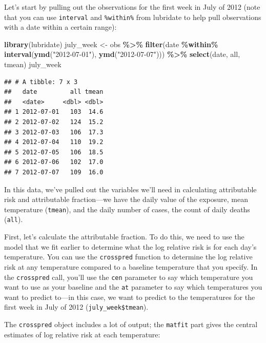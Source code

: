 \documentclass[
]{book}
\newenvironment{Shaded}{\begin{snugshade}}{\end{snugshade}}
\newcommand{\FunctionTok}[1]{\textcolor[rgb]{0.13,0.29,0.53}{\textbf{#1}}}
\newcommand{\NormalTok}[1]{#1}
\newcommand{\OtherTok}[1]{\textcolor[rgb]{0.56,0.35,0.01}{#1}}
\newcommand{\SpecialCharTok}[1]{\textcolor[rgb]{0.81,0.36,0.00}{\textbf{#1}}}
\newcommand{\StringTok}[1]{\textcolor[rgb]{0.31,0.60,0.02}{#1}}
\begin{document}
Let's start by pulling out the observations for the first week in July of 2012 (note that you can use \texttt{interval} and \texttt{\%within\%} from lubridate to help pull observations with a date within a certain range):

\begin{Shaded}
\begin{Highlighting}[]
\FunctionTok{library}\NormalTok{(lubridate)}
\NormalTok{july\_week }\OtherTok{\textless{}{-}}\NormalTok{ obs }\SpecialCharTok{\%\textgreater{}\%} 
  \FunctionTok{filter}\NormalTok{(date }\SpecialCharTok{\%within\%} \FunctionTok{interval}\NormalTok{(}\FunctionTok{ymd}\NormalTok{(}\StringTok{"2012{-}07{-}01"}\NormalTok{), }\FunctionTok{ymd}\NormalTok{(}\StringTok{"2012{-}07{-}07"}\NormalTok{))) }\SpecialCharTok{\%\textgreater{}\%} 
  \FunctionTok{select}\NormalTok{(date, all, tmean)}
\NormalTok{july\_week}
\end{Highlighting}
\end{Shaded}

\begin{verbatim}
## # A tibble: 7 x 3
##   date         all tmean
##   <date>     <dbl> <dbl>
## 1 2012-07-01   103  14.6
## 2 2012-07-02   124  15.2
## 3 2012-07-03   106  17.3
## 4 2012-07-04   110  19.2
## 5 2012-07-05   106  18.5
## 6 2012-07-06   102  17.0
## 7 2012-07-07   109  16.0
\end{verbatim}

In this data, we've pulled out the variables we'll need in calculating attributable risk and attributable fraction---we have the daily value of the exposure, mean temperature (\texttt{tmean}), and the daily number of cases, the count of daily deaths (\texttt{all}).

First, let's calculate the attributable fraction. To do this, we need to use
the model that we fit earlier to determine what the log relative risk is for each day's temperature. You can use the \texttt{crosspred} function to determine the log relative risk at any temperature compared to a baseline temperature that you specify. In the \texttt{crosspred} call, you'll use the \texttt{cen} parameter to say which temperature you want to use as your baseline and the \texttt{at} parameter to say which temperatures you want to predict to---in this case, we want to predict to the temperatures for the first week in July of 2012 (\texttt{july\_week\$tmean}).

The \texttt{crosspred} object includes a lot of output; the \texttt{matfit} part gives the central estimates of log relative risk at each temperature:
\end{document}
